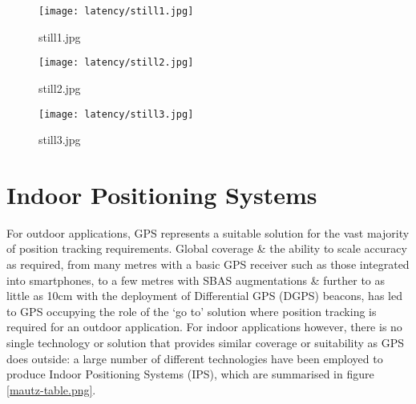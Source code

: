 \begin{figure}[h]
    \begin{center}
    \begin{minipage}{.32\textwidth}
        \begin{center}
        \texttt{[image: latency/still1.jpg]}
        \caption{still1.jpg}
        \label{still1.jpg}
        \end{center}
    \end{minipage}%
    \hspace{.01\textwidth}
    \begin{minipage}{.32\textwidth}
		\begin{center}
        \texttt{[image: latency/still2.jpg]}
        \caption{still2.jpg}
        \label{still2.jpg}
        \end{center}
    \end{minipage}%
    \hspace{.01\textwidth}
    \begin{minipage}{.32\textwidth}
        \begin{center}
        \texttt{[image: latency/still3.jpg]}
        \caption{still3.jpg}
        \label{still3.jpg}
        \end{center}
    \end{minipage}
    \end{center}
\end{figure}


\section{Indoor Positioning Systems}

For outdoor applications, GPS represents a suitable solution for the vast majority of position tracking requirements. Global coverage \& the ability to scale accuracy as required, from many metres with a basic GPS receiver such as those integrated into smartphones, to a few metres with SBAS augmentations \& further to as little as 10cm with the deployment of Differential GPS (DGPS) beacons, has led to GPS occupying the role of the `go to' solution where position tracking is required for an outdoor application. For indoor applications however, there is no single technology or solution that provides similar coverage or suitability as GPS does outside: a large number of different technologies have been employed to produce Indoor Positioning Systems (IPS), which are summarised in figure \ref{mautz-table.png}.

